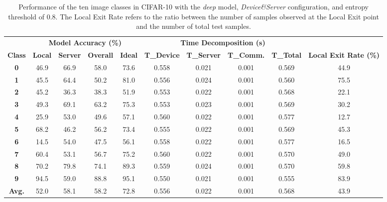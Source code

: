 \documentclass[format=acmsmall, review=false, screen=true]{acmart}
\begin{document}
    \begin{table}[hbt]
        \centering
        \caption{Performance of the ten image classes in CIFAR-10 with the \emph{deep} model, \emph{Device\&Server} configuration, and entropy threshold of 0.8. The Local Exit Rate refers to the ratio between the number of samples observed at the Local Exit point and the number of total test samples.}
        \label{tab:4}
        \scriptsize{
        \begin{tabular}{c|cccc|cccc|c}
              & \multicolumn{4}{c|}{\textbf{Model Accuracy (\%)}} & \multicolumn{4}{c|}{\textbf{Time Decomposition (s)}} &                   \\
        \textbf{Class} & \textbf{Local}     & \textbf{Server}  & \textbf{Overall}  & \textbf{Ideal}   & \textbf{T\_Device} & \textbf{T\_Server} & \textbf{T\_Comm.} & \textbf{T\_Total} & \textbf{Local Exit Rate (\%)} \\ \hline\hline
        \textbf{0}     & 46.9    & 66.9  & 58.0   & 73.6  & 0.558     & 0.021     & 0.001    & 0.569    & 44.9            \\
        \textbf{1}     & 45.5    & 64.4  & 50.2   & 81.0  & 0.556     & 0.024     & 0.001    & 0.560    & 75.5            \\
        \textbf{2}     & 45.2    & 36.3  & 38.3   & 51.9  & 0.553     & 0.022     & 0.001    & 0.568    & 22.1            \\
        \textbf{3}     & 49.3    & 69.1  & 63.2   & 75.3  & 0.553     & 0.023     & 0.001    & 0.569    & 30.2            \\
        \textbf{4}     & 25.9    & 53.0  & 49.6   & 57.1  & 0.560     & 0.022     & 0.001    & 0.577    & 12.7            \\
        \textbf{5}     & 68.2    & 46.2  & 56.2   & 73.4  & 0.555     & 0.022     & 0.001    & 0.569    & 45.3            \\
        \textbf{6}     & 14.5    & 54.0  & 47.5   & 56.1  & 0.558     & 0.022     & 0.001    & 0.577    & 16.5            \\
        \textbf{7}     & 60.4    & 53.1  & 56.7   & 75.2  & 0.560     & 0.022     & 0.001    & 0.570    & 49.0            \\
        \textbf{8}     & 70.2    & 79.8  & 74.1   & 89.3  & 0.559     & 0.024     & 0.001    & 0.570    & 59.8            \\
        \textbf{9}     & 94.5    & 59.0  & 88.8   & 95.1  & 0.550     & 0.021     & 0.001 & 0.555    & 83.9            \\ \hline
        \textbf{Avg.}  & 52.0    & 58.1  & 58.2   & 72.8  & 0.556     & 0.022     & 0.001    & 0.568    & 43.9            \\ \hline
        \end{tabular}
        }%
    \end{table}
\end{document}
